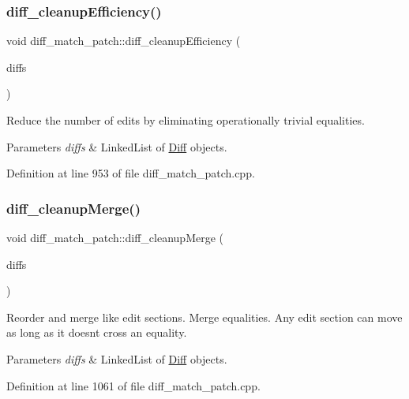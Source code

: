 \subsubsection{\texorpdfstring{diff\+\_\+cleanup\+Efficiency()}{diff\_cleanupEfficiency()}}
{\footnotesize\ttfamily void diff\+\_\+match\+\_\+patch\+::diff\+\_\+cleanup\+Efficiency (\begin{DoxyParamCaption}\item[{Q\+List$<$ \hyperlink{class_diff}{Diff} $>$ \&}]{diffs }\end{DoxyParamCaption})}

Reduce the number of edits by eliminating operationally trivial equalities. 
\begin{DoxyParams}{Parameters}
{\em diffs} & Linked\+List of \hyperlink{class_diff}{Diff} objects. \\
\hline
\end{DoxyParams}


Definition at line 953 of file diff\+\_\+match\+\_\+patch.\+cpp.

\mbox{\label{classdiff__match__patch_ad64d391bc3f34cad326f869eedb748f9}} 
\subsubsection{\texorpdfstring{diff\+\_\+cleanup\+Merge()}{diff\_cleanupMerge()}}
{\footnotesize\ttfamily void diff\+\_\+match\+\_\+patch\+::diff\+\_\+cleanup\+Merge (\begin{DoxyParamCaption}\item[{Q\+List$<$ \hyperlink{class_diff}{Diff} $>$ \&}]{diffs }\end{DoxyParamCaption})}

Reorder and merge like edit sections. Merge equalities. Any edit section can move as long as it doesn\textquotesingle{}t cross an equality. 
\begin{DoxyParams}{Parameters}
{\em diffs} & Linked\+List of \hyperlink{class_diff}{Diff} objects. \\
\hline
\end{DoxyParams}


Definition at line 1061 of file diff\+\_\+match\+\_\+patch.\+cpp.

\mbox{\label{classdiff__match__patch_a1150e91652b023e8893555f737ac9894}} 
